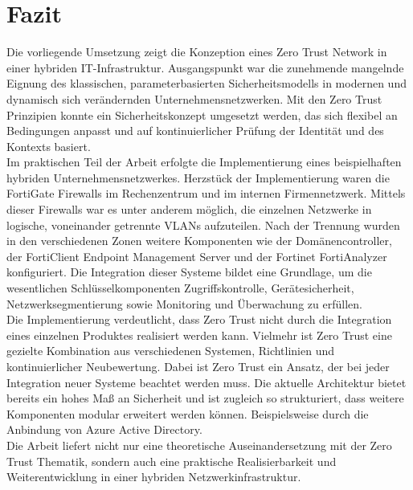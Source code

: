 \documentclass[lettersize,journal]{IEEEtran}
\begin{document}
\section{Fazit}
Die vorliegende Umsetzung zeigt die Konzeption eines Zero Trust Network in einer hybriden IT-Infrastruktur. Ausgangspunkt war die zunehmende mangelnde Eignung des klassischen, parameterbasierten Sicherheitsmodells in modernen und dynamisch sich verändernden Unternehmensnetzwerken. Mit den Zero Trust Prinzipien konnte ein Sicherheitskonzept umgesetzt werden, das sich flexibel an Bedingungen anpasst und auf kontinuierlicher Prüfung der Identität und des Kontexts basiert.\\
Im praktischen Teil der Arbeit erfolgte die Implementierung eines beispielhaften hybriden Unternehmensnetzwerkes. Herzstück der Implementierung waren die FortiGate Firewalls im Rechenzentrum und im internen Firmennetzwerk. Mittels dieser Firewalls war es unter anderem möglich, die einzelnen Netzwerke in logische, voneinander getrennte VLANs aufzuteilen. Nach der Trennung wurden in den verschiedenen Zonen weitere Komponenten wie der Domänencontroller, der FortiClient Endpoint Management Server und der Fortinet FortiAnalyzer konfiguriert. Die Integration dieser Systeme bildet eine Grundlage, um die wesentlichen Schlüsselkomponenten Zugriffskontrolle, Gerätesicherheit, Netzwerksegmentierung sowie Monitoring und Überwachung zu erfüllen.\\
Die Implementierung verdeutlicht, dass Zero Trust nicht durch die Integration eines einzelnen Produktes realisiert werden kann. Vielmehr ist Zero Trust eine gezielte Kombination aus verschiedenen Systemen, Richtlinien und kontinuierlicher Neubewertung. Dabei ist Zero Trust ein Ansatz, der bei jeder Integration neuer Systeme beachtet werden muss. Die aktuelle Architektur bietet bereits ein hohes Maß an Sicherheit und ist zugleich so strukturiert, dass weitere Komponenten modular erweitert werden können. Beispielsweise durch die Anbindung von Azure Active Directory.\\
Die Arbeit liefert nicht nur eine theoretische Auseinandersetzung mit der Zero Trust Thematik, sondern auch eine praktische Realisierbarkeit und Weiterentwicklung in einer hybriden Netzwerkinfrastruktur.




\end{document}
